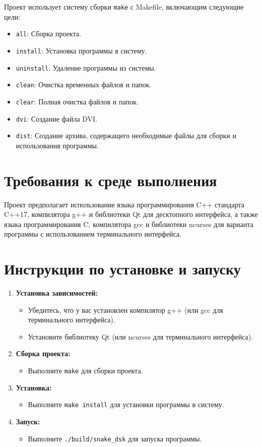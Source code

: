 \documentclass{article}
\begin{document}
Проект использует систему сборки \texttt{make} с Makefile, включающим следующие цели:

\begin{itemize}
    \item \texttt{all}: Сборка проекта.
    \item \texttt{install}: Установка программы в систему.
    \item \texttt{uninstall}: Удаление программы из системы.
    \item \texttt{clean}: Очистка временных файлов и папок.
    \item \texttt{clear}: Полная очистка файлов и папок.
    \item \texttt{dvi}: Создание файла DVI.
    \item \texttt{dist}: Создание архива, содержащего необходимые файлы для сборки и использования программы.
\end{itemize}

\section{Требования к среде выполнения}

Проект предполагает использование языка программирования C++ стандарта C++17, компилятора g++ и библиотеки Qt для десктопного интерфейса, а также языка программирования C, компилятора gcc и библиотеки ncurses для варианта программы с использованием терминального интерфейса.

\section{Инструкции по установке и запуску}

\begin{enumerate}
    \item \textbf{Установка зависимостей:}
        \begin{itemize}
            \item Убедитесь, что у вас установлен компилятор g++ (или gcc для терминального интерфейса).
            \item Установите библиотеку Qt (или ncurses для терминального интерфейса).
        \end{itemize}
    \item \textbf{Сборка проекта:}
        \begin{itemize}
            \item Выполните \texttt{make} для сборки проекта.
        \end{itemize}
    \item \textbf{Установка:}
        \begin{itemize}
            \item Выполните \texttt{make install} для установки программы в систему.
        \end{itemize}
    \item \textbf{Запуск:}
        \begin{itemize}
            \item Выполните \texttt{./build/snake_dsk} для запуска программы.
        \end{itemize}
\end{enumerate}
\end{document}

